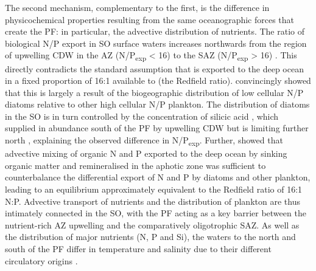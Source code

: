 The second mechanism, complementary to the first, is the difference in physicochemical properties resulting from the same oceanographic forces that create the \ac{PF}: in particular, the advective distribution of nutrients.
The ratio of biological N/P export in \ac{SO} surface waters increases northwards from the region of upwelling \ac{CDW} in the \ac{AZ} (N/P\textsubscript{exp} \textless{} 16) to the \ac{SAZ} (N/P\textsubscript{exp} \textgreater{} 16) \cite{Weber:2010fi}.
This directly contradicts the standard assumption that  is exported to the deep ocean in a fixed proportion of \textapprox{}16:1 available  to  (the Redfield ratio).
\citet{Weber:2010fi} convincingly showed that this is largely a result of the biogeographic distribution of low cellular N/P diatoms relative to other high cellular N/P plankton.
The distribution of diatoms in the \ac{SO} is in turn controlled by the concentration of silicic acid \cite{MFranck:2000kt}, which supplied in abundance south of the \ac{PF} by upwelling \ac{CDW} but is limiting further north \citep[widely held, but well summarised by][]{Coale:2004to}, explaining the observed difference in N/P\textsubscript{exp}.
Further, \citet{Weber:2010fi} showed that advective mixing of organic N and P exported to the deep ocean by sinking organic matter and remineralised in the aphotic zone was sufficient to counterbalance the differential export of N and P by diatoms and other plankton, leading to an equilibrium approximately equivalent to the Redfield ratio of 16:1 N:P.
Advective transport of nutrients and the distribution of plankton are thus intimately connected in the \ac{SO}, with the \ac{PF} acting as a key barrier between the nutrient-rich \ac{AZ} upwelling and the comparatively oligotrophic \ac{SAZ}.
As well as the distribution of major nutrients (N, P and Si), the waters to the north and south of the \ac{PF} differ in temperature and salinity due to their different circulatory origins \cite{Foldvik:1988gp}.


